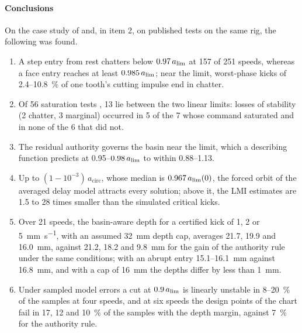 \paragraph{Conclusions}
On the case study of \citet{ozsoy2026robust} and, in item 2, on published tests on the same rig, the following was found.
\begin{enumerate}
\item A step entry from rest chatters below $0.97\,a_{\lim}$ at 157 of 251 speeds, whereas a face entry reaches at least $0.985\,a_{\lim}$; near the limit, worst-phase kicks of 2.4--\SI{10.8}{\percent} of one tooth's cutting impulse end in chatter.
\item Of 56 saturation tests \citep{ozsoy2025frequency}, 13 lie between the two linear limits: losses of stability (2 chatter, 3 marginal) occurred in 5 of the 7 whose command saturated and in none of the 6 that did not.
\item The residual authority governs the basin near the limit, which a describing function predicts at 0.95--$0.98\,a_{\lim}$ to within 0.88--1.13.
\item Up to $(1-10^{-3})\,a_{\mathrm{circ}}$, whose median is $0.967\,a_{\lim}(0)$, the forced orbit of the averaged delay model attracts every solution; above it, the LMI estimates are 1.5 to 28 times smaller than the simulated critical kicks.
\item Over 21 speeds, the basin-aware depth for a certified kick of 1, 2 or \SI{5}{\milli\metre\per\second}, with an assumed \SI{32}{\milli\metre} depth cap, averages 21.7, 19.9 and \SI{16.0}{\milli\metre}, against 21.2, 18.2 and \SI{9.8}{\milli\metre} for the gain of the authority rule under the same conditions; with an abrupt entry 15.1--\SI{16.1}{\milli\metre} against \SI{16.8}{\milli\metre}, and with a cap of \SI{16}{\milli\metre} the depths differ by less than \SI{1}{\milli\metre}.
\item Under sampled model errors a cut at $0.9\,a_{\lim}$ is linearly unstable in 8--\SI{20}{\percent} of the samples at four speeds, and at six speeds the design points of the chart fail in 17, 12 and \SI{10}{\percent} of the samples with the depth margin, against \SI{7}{\percent} for the authority rule.
\end{enumerate}
